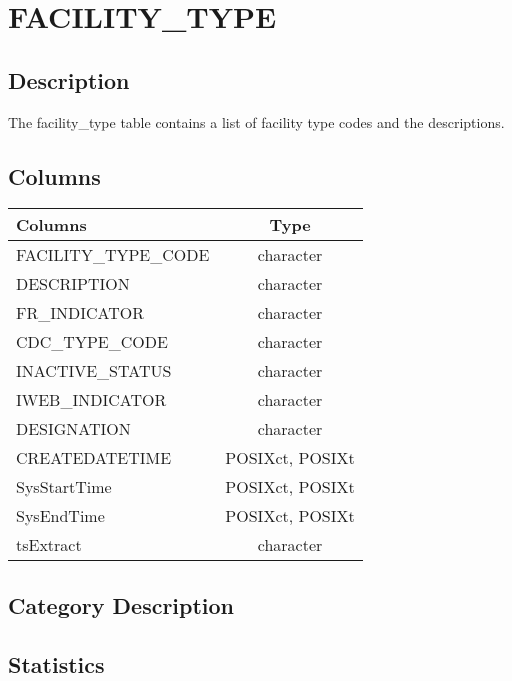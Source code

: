 \documentclass[
  letterpaper,
  DIV=11,
  numbers=noendperiod]{scrreprt}
\begin{document}
\hypertarget{facility_type}{%
\chapter*{FACILITY\_TYPE}\label{facility_type}}

\hypertarget{description-11}{%
\section*{Description}\label{description-11}}

The facility\_type table contains a list of facility type codes and the
descriptions.

\hypertarget{columns-11}{%
\section*{Columns}\label{columns-11}}

\begin{longtable}{lc}
\toprule
Columns & Type \\ 
\midrule
FACILITY\_TYPE\_CODE & character \\ 
DESCRIPTION & character \\ 
FR\_INDICATOR & character \\ 
CDC\_TYPE\_CODE & character \\ 
INACTIVE\_STATUS & character \\ 
IWEB\_INDICATOR & character \\ 
DESIGNATION & character \\ 
CREATEDATETIME & POSIXct, POSIXt \\ 
SysStartTime & POSIXct, POSIXt \\ 
SysEndTime & POSIXct, POSIXt \\ 
tsExtract & character \\ 
\bottomrule
\end{longtable}

\hypertarget{category-description-11}{%
\section*{Category Description}\label{category-description-11}}

\hypertarget{statistics-11}{%
\section*{Statistics}\label{statistics-11}}
\end{document}
